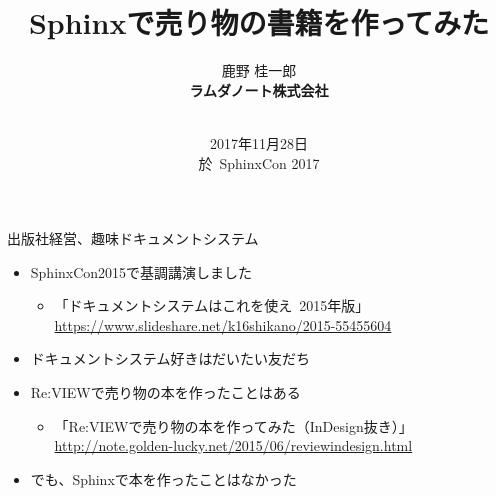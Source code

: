 \documentclass[14pt,dvipdfmx,uplatex]{beamer}
\title{Sphinxで売り物の書籍を作ってみた}
\author{\sffamily 鹿野 桂一郎\\
\bfseries ラムダノート株式会社\\
\small\bfseries \email{k16.shikano@lambdanote.com} \\ 
\twitter{golden\_lucky} 
}
\date{\sffamily\footnotesize 2017年11月28日\\ 於\, SphinxCon 2017}
\begin{document}
\selectfont

\frame{\titlepage}

\begin{frame}[t]{\inhibitglue 出版社経営、趣味ドキュメントシステム}
  \sffamily
    \begin{itemize}
      \item SphinxCon2015で基調講演しました 
        \begin{itemize}\footnotesize
          \item 「ドキュメントシステムはこれを使え\ 2015年版」 \url{https://www.slideshare.net/k16shikano/2015-55455604}
        \end{itemize}
      \item ドキュメントシステム好きはだいたい友だち
      \item Re:VIEWで売り物の本を作ったことはある
        \begin{itemize}\footnotesize
          \item 「Re:VIEWで売り物の本を作ってみた（InDesign抜き）」 \url{http://note.golden-lucky.net/2015/06/reviewindesign.html}
        \end{itemize}
      \item でも、Sphinxで本を作ったことはなかった
    \end{itemize}
\end{frame}
\end{document}
